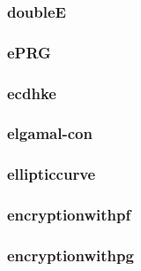\begin{frame} \frametitle{doubleE}
\begin{figure}
\begin{center}

\end{center}
\end{figure}
\end{frame}
\begin{frame} \frametitle{ePRG}
\begin{figure}
\begin{center}

\end{center}
\end{figure}
\end{frame}
\begin{frame} \frametitle{ecdhke}
\begin{figure}
\begin{center}

\end{center}
\end{figure}
\end{frame}
\begin{frame} \frametitle{elgamal-con}
\begin{figure}
\begin{center}

\end{center}
\end{figure}
\end{frame}
\begin{frame} \frametitle{ellipticcurve}
\begin{figure}
\begin{center}

\end{center}
\end{figure}
\end{frame}
\begin{frame} \frametitle{encryptionwithpf}
\begin{figure}
\begin{center}

\end{center}
\end{figure}
\end{frame}
\begin{frame} \frametitle{encryptionwithpg}
\begin{figure}
\begin{center}

\end{center}
\end{figure}
\end{frame}
